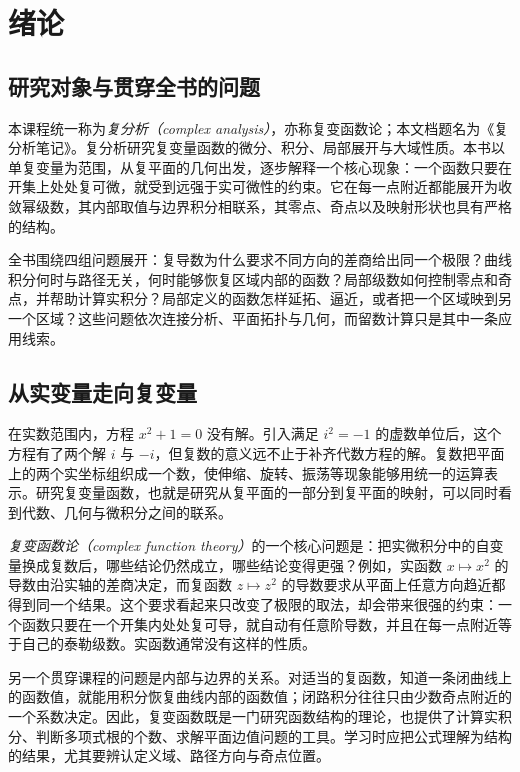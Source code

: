 \setcounter{chapter}{0} %
\chapter{绪论}
\label{chap:ca-introduction}

\section{研究对象与贯穿全书的问题}

本课程统一称为\emph{复分析（complex analysis）}，亦称复变函数论；本文档题名为《复分析笔记》。复分析研究复变量函数的微分、积分、局部展开与大域性质。本书以单复变量为范围，从复平面的几何出发，逐步解释一个核心现象：一个函数只要在开集上处处复可微，就受到远强于实可微性的约束。它在每一点附近都能展开为收敛幂级数，其内部取值与边界积分相联系，其零点、奇点以及映射形状也具有严格的结构。

全书围绕四组问题展开：复导数为什么要求不同方向的差商给出同一个极限？曲线积分何时与路径无关，何时能够恢复区域内部的函数？局部级数如何控制零点和奇点，并帮助计算实积分？局部定义的函数怎样延拓、逼近，或者把一个区域映到另一个区域？这些问题依次连接分析、平面拓扑与几何，而留数计算只是其中一条应用线索。

\section{从实变量走向复变量}

在实数范围内，方程 $x^2+1=0$ 没有解。引入满足 $i^2=-1$ 的虚数单位后，这个方程有了两个解 $i$ 与 $-i$，但复数的意义远不止于补齐代数方程的解。复数把平面上的两个实坐标组织成一个数，使伸缩、旋转、振荡等现象能够用统一的运算表示。研究复变量函数，也就是研究从复平面的一部分到复平面的映射，可以同时看到代数、几何与微积分之间的联系。

\emph{复变函数论（complex function theory）}的一个核心问题是：把实微积分中的自变量换成复数后，哪些结论仍然成立，哪些结论变得更强？例如，实函数 $x\mapsto x^2$ 的导数由沿实轴的差商决定，而复函数 $z\mapsto z^2$ 的导数要求从平面上任意方向趋近都得到同一个结果。这个要求看起来只改变了极限的取法，却会带来很强的约束：一个函数只要在一个开集内处处复可导，就自动有任意阶导数，并且在每一点附近等于自己的泰勒级数。实函数通常没有这样的性质。

另一个贯穿课程的问题是内部与边界的关系。对适当的复函数，知道一条闭曲线上的函数值，就能用积分恢复曲线内部的函数值；闭路积分往往只由少数奇点附近的一个系数决定。因此，复变函数既是一门研究函数结构的理论，也提供了计算实积分、判断多项式根的个数、求解平面边值问题的工具。学习时应把公式理解为结构的结果，尤其要辨认定义域、路径方向与奇点位置。

